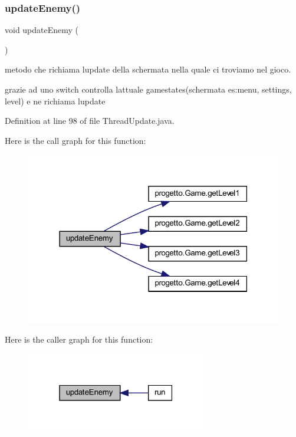 \subsubsection{\texorpdfstring{update\+Enemy()}{updateEnemy()}}
{\footnotesize\ttfamily void update\+Enemy (\begin{DoxyParamCaption}{ }\end{DoxyParamCaption})\hspace{0.3cm}{\ttfamily [private]}}



metodo che richiama l\textquotesingle{}update della schermata nella quale ci troviamo nel gioco. 

grazie ad uno switch controlla l\textquotesingle{}attuale gamestates(schermata es\+:menu, settings, level) e ne richiama l\textquotesingle{}update 

Definition at line 98 of file Thread\+Update.\+java.

Here is the call graph for this function\+:\nopagebreak
\begin{figure}[H]
\begin{center}
\leavevmode
\includegraphics[width=318pt]{classprogetto_1_1_thread_update_af005ec68c869a6acd5e833cba9330a50_cgraph}
\end{center}
\end{figure}
Here is the caller graph for this function\+:\nopagebreak
\begin{figure}[H]
\begin{center}
\leavevmode
\includegraphics[width=223pt]{classprogetto_1_1_thread_update_af005ec68c869a6acd5e833cba9330a50_icgraph}
\end{center}
\end{figure}
\mbox{\label{classprogetto_1_1_thread_update_ac83c203b559f6fd0bb225744d7ccf854}} 
